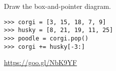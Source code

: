 \begin{blocksection}
\question Draw the box-and-pointer diagram.

\begin{lstlisting}
>>> corgi = [3, 15, 18, 7, 9]
>>> husky = [8, 21, 19, 11, 25]
>>> poodle = corgi.pop()
>>> corgi += husky[-3:]
\end{lstlisting}

\begin{solution}[1in]
\url{https://goo.gl/NbK9YF}
\end{solution}
\end{blocksection}

